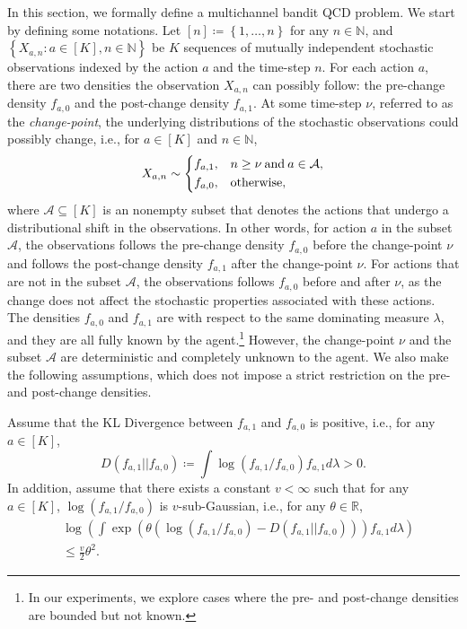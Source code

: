 \documentclass[letterpaper, 10 pt, conference]{ieeeconf}  %
\newcommand{\lp}{\left(}
\newcommand{\rp}{\right)}
\newcommand{\lb}{\left[}
\newcommand{\rb}{\right]}
\newcommand{\lbp}{\left\{}
\newcommand{\rbp}{\right\}}
\newcommand{\mcal}{\mathcal}
\newcommand{\mrm}{\mathrm}
\newcommand{\mbb}{\mathbb}
\begin{document}
In this section, we formally define a multichannel bandit QCD problem. We start by defining some notations. Let $\lb n \rb \coloneqq \lbp 1, \dots, n \rbp$ for any $n \in \mbb{N}$, and 
$\left\{ X_{a,n} : a \in [K], n \in \mbb{N}\right\}$ be $K$ sequences of mutually independent stochastic observations indexed by the action $a$ and the time-step $n$. For each action $a$, there are two densities the observation $X_{a,n}$ can possibly follow: the pre-change density $f_{a,0}$ and the post-change density $f_{a,1}$. At some time-step $\nu$, referred to as the \emph{change-point}, the underlying distributions of the stochastic observations could possibly change, i.e., for $a \in \lb K \rb$ and $n \in \mbb{N}$,
%
\begin{equation}\label{eq:obs_distr}
    X_{a,n} \sim \begin{dcases}
        f_{a,1},& n \geq \nu \mrm{\: and\:} a \in \mcal{A}, \\
        f_{a,0}, & \mrm{otherwise},
    \end{dcases}
\end{equation}
%
where $\mcal{A} \subseteq \lb K \rb$ is an nonempty subset that denotes the actions that undergo a distributional shift in the observations. In other words, for action $a$ in the subset $\mcal{A}$, the observations follows the pre-change density $f_{a,0}$ before the change-point $\nu$ and follows the post-change density $f_{a,1}$ after the change-point $\nu$. For actions that are not in the subset $\mcal{A}$, the observations follows $f_{a,0}$ before and after $\nu$, as the change does not affect the stochastic properties associated with these actions. The densities $f_{a,0}$ and $f_{a,1}$ are with respect to the same dominating measure $\lambda$, and they are all fully known by the agent.\footnote{In our experiments, we explore cases where the pre- and post-change densities are bounded but not known.} However, the change-point $\nu$ and the subset $\mcal{A}$ are deterministic and completely unknown to the agent. We also make the following assumptions, which does not impose a strict restriction on the pre- and post-change densities.

\begin{assumption}\label{assum:KL}
Assume that the KL Divergence between $f_{a,1}$ and $f_{a,0}$ is positive, i.e., for any $a \in \lb K \rb$,
%
\begin{equation}%
    D \lp f_{a,1} || f_{a,0} \rp \coloneqq \int \log \lp f_{a,1} / f_{a,0} \rp f_{a,1}d\lambda > 0.
\end{equation}
%  
In addition, assume that there exists a constant $v < \infty$ such that for any $a \in \lb K \rb$, $\log\lp f_{a,1} / f_{a,0} \rp$ is $v$-sub-Gaussian, i.e., for any $\theta \in \mbb{R}$,
%
\begin{align}%
    &\log \lp \int \exp \lp \theta \lp \log \lp f_{a,1} / f_{a,0} \rp - D \lp f_{a,1} || f_{a,0} \rp \rp \rp f_{a,1}d\lambda \rp \nonumber\\
    &\leq \frac{v}{2}\theta^{2}.
\end{align}
\end{assumption}
\vspace{2pt}
\end{document}
